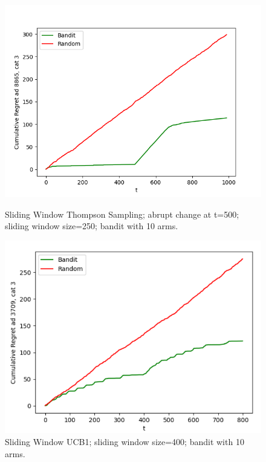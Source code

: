 \documentclass{article}
\begin{document}
\begin{figure}[H]

\begin{minipage}{0.48\textwidth}
\centering
\includegraphics[width=1\linewidth]{images/quality sliding window.png}
\caption{Sliding Window Thompson Sampling; abrupt change at t=500; sliding window size=250; bandit with 10 arms.}
\end{minipage}
\hfill
\begin{minipage}{0.48\textwidth}
\centering
\includegraphics[width=1\linewidth]{images/sliding window ucb.png}
\caption{Sliding Window UCB1; sliding window size=400; bandit with 10 arms.}
\end{minipage}

\end{figure}
\end{document}
